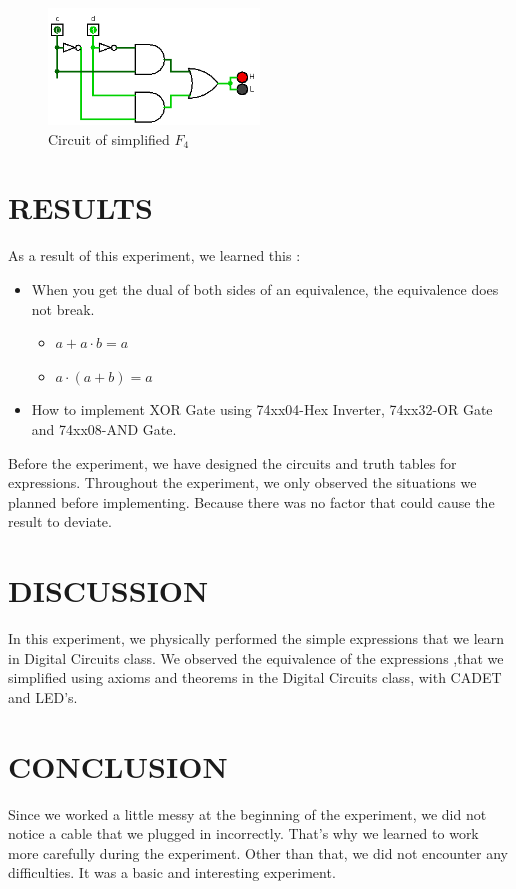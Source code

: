 \documentclass[pdftex,12pt,a4paper]{article}
\begin{document}
\begin{figure}[ht]
	\centering
	\includegraphics[width=0.5\textwidth]{2_4.png}	
	\caption{Circuit of simplified $F_4$}
	\label{fig1}
\end{figure}

\section{RESULTS}

As a result of this experiment, we learned this :
\begin{itemize}
    \item When you get the dual of both sides of an equivalence, the equivalence does not break.
    \begin{itemize}
        \item $a + a \cdot b = a$
        \item $a \cdot (a + b) = a$
    \end{itemize}
    \item How to implement XOR Gate using 74xx04-Hex Inverter, 74xx32-OR Gate and 74xx08-AND Gate.
\end{itemize}


Before the experiment, we have designed the circuits and truth tables for expressions. Throughout the experiment, we only observed the situations we planned before implementing. Because there was no factor that could cause the result to deviate.

\section{DISCUSSION}
In this experiment, we physically performed the simple expressions that we learn in Digital Circuits class. We observed the equivalence of the expressions ,that we simplified using axioms and theorems in the Digital Circuits class, with CADET and LED's. 

\section{CONCLUSION}
Since we worked a little messy at the beginning of the experiment, we did not notice a cable that we plugged in incorrectly. That's why we learned to work more carefully during the experiment. Other than that, we did not encounter any difficulties. It was a basic and interesting experiment.


\newpage
{}



\end{document}
